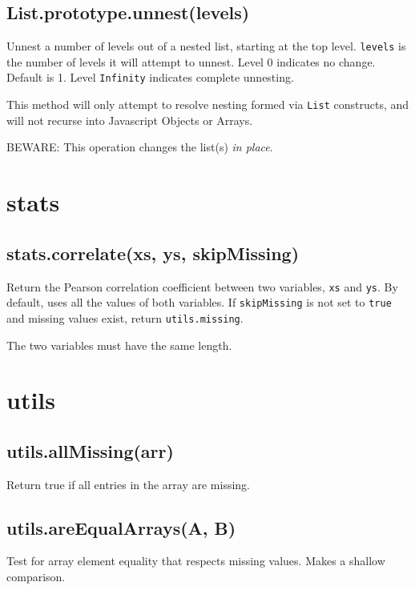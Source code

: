 \documentclass{article}
\begin{document}
    \subsection*{List.prototype.unnest(levels)}
    Unnest a number of levels out of a nested list, starting at the
top level. \texttt{levels} is the number of levels it will attempt to unnest.
Level 0 indicates no change. Default is 1.
Level \texttt{Infinity} indicates complete unnesting.


This method will only attempt to resolve nesting formed via \texttt{List} constructs,
and will not recurse into Javascript Objects or Arrays.


BEWARE: This operation changes the list(s) \emph{in place}.


  \section{stats}
    \subsection*{stats.correlate(xs, ys, skipMissing)}
    Return the Pearson correlation coefficient between two variables, \texttt{xs} and \texttt{ys}.
By default, uses all the values of both variables.  If \texttt{skipMissing} is not set
to \texttt{true} and missing values exist, return \texttt{utils.missing}.


The two variables must have the same length.


  \section{utils}
    \subsection*{utils.allMissing(arr)}
    Return true if all entries in the array are missing.


    \subsection*{utils.areEqualArrays(A, B)}
    Test for array element equality that respects missing values.
Makes a shallow comparison.
\end{document}
